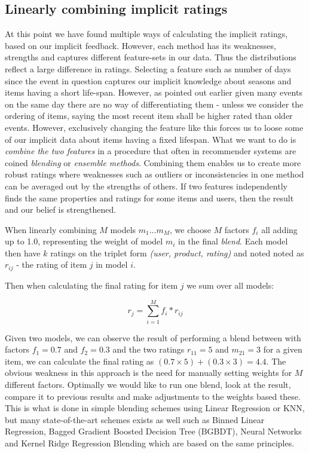 \subsection{Linearly combining implicit ratings}

At this point we have found multiple ways of calculating the implicit ratings,
based on our implicit feedback. However, each method has its weaknesses,
strengths and captures different feature-sets in our data. Thus the
distributions reflect a large difference in ratings. Selecting a feature such
as number of days since the event in question captures our implicit knowledge
about seasons and items having a short life-span. However, as pointed out
earlier given many events on the same day there are no way of differentiating
them - unless we consider the ordering of items, saying the most recent item
shall be higher rated than older events. However, exclusively changing the
feature like this forces us to loose some of our implicit data about items
having a fixed lifespan. What we want to do is \textit{combine the two
features} in a procedure that often in recommender systems are coined
\textit{blending} or \textit{ensemble methods}. Combining them enables us to
create more robust ratings where weaknesses such as outliers or inconsistencies
in one method can be averaged out by the strengths of others. If two features
independently finds the same properties and ratings for some items and users,
then the result and our belief is strengthened.

When linearly combining $M$ models $m_1 \dots m_M$, we choose $M$ factors $f_i$
all adding up to 1.0, representing the weight of model $m_{i}$ in the final
\textit{blend}. Each model then have $k$ ratings on the triplet form
\textit{(user, product, rating)} and noted noted as $r_{ij}$ - the rating of
item $j$ in model $i$.

Then when calculating the final rating for item $j$ we sum over all
models:

\begin{equation}
  r_j = \sum _{i=1}^{M} f_{i} * r_{ij}
\end{equation}

Given two models, we can observe the result of performing a blend between with
factors $f_1 = 0.7$ and $f_2 = 0.3$ and the two ratings $r_{11} = 5$ and
$m_{21} = 3$ for a given item, we can calculate the final rating as $(0.7
\times 5) + (0.3 \times 3) = 4.4$. The obvious weakness in this approach is the
need for manually setting weights for $M$ different factors. Optimally we would
like to run one blend, look at the result, compare it to previous results and
make adjustments to the weights based these. This is what is done in simple
blending schemes using Linear Regression or KNN, but many state-of-the-art
schemes exists as well such as Binned Linear Regression, Bagged Gradient
Boosted Decision Tree (BGBDT), Neural Networks and Kernel Ridge Regression
Blending \cite{jahrer2010combining} \cite{toscher2009bigchaos} which are based
on the same principles.

